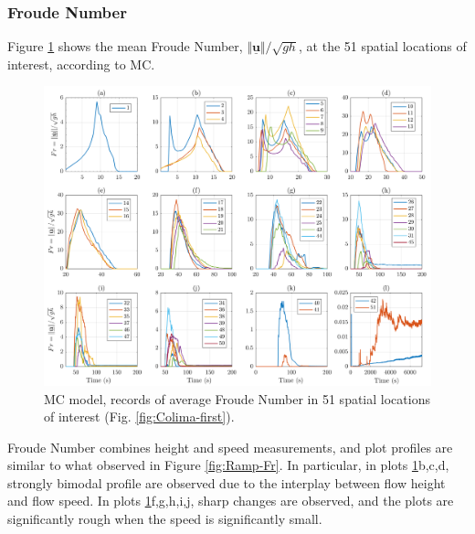 \documentclass{article}
\begin{document}
\subsubsection{Froude Number}
Figure \ref{fig:BAF-Fr-MC} shows the mean Froude Number, $\Vert \underline{\mathbf{u}} \Vert/\sqrt{gh}$, at the 51 spatial locations of interest, according to MC.
\begin{figure}[H]
         \centering
        \includegraphics[width=1\textwidth]{MC&VS_51/Froude_MC2.png}
        \caption{MC model, records of average Froude Number in 51 spatial locations of interest (Fig. \ref{fig:Colima-first}).}
        \label{fig:BAF-Fr-MC}
\end{figure}
Froude Number combines height and speed measurements, and plot profiles are similar to what observed in Figure \ref{fig:Ramp-Fr}. In particular, in plots \ref{fig:BAF-Fr-MC}b,c,d, strongly bimodal profile are observed due to the interplay between flow height and flow speed. In plots \ref{fig:BAF-Fr-MC}f,g,h,i,j, sharp changes are observed, and the plots are significantly rough when the speed is significantly small.

\newpage
\end{document}
